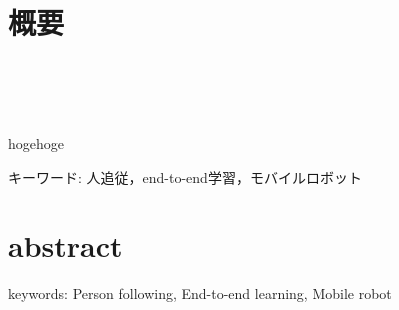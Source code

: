 \chapter*{概要}
\thispagestyle{empty}
%
\begin{center}
  \scalebox{1.5}{引き紐を利用した視覚と行動のend-to-end 学習による}\\
  \scalebox{1.5}{移動ロボットの人追従行動の生成}\\
  \scalebox{1.5}{（引き紐の角度に応じた停止動作の追加）}\\
\end{center}
\vspace{1.0zh}
%
\par
hogehoge
\vspace{12.0zh}

\par キーワード: 人追従，end-to-end学習，モバイルロボット
%
\newpage
\chapter*{abstract}
\thispagestyle{empty}
%
\begin{center}
  \scalebox{1.3}{title}
\end{center}
\vspace{1.0zh}
%


keywords: Person following, End-to-end learning, Mobile robot
